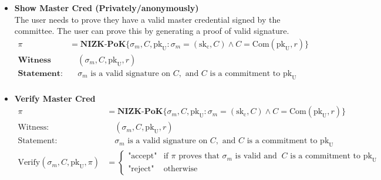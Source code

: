 \begin{itemize}
    \item \textbf{Show Master Cred (Privately/anonymously)}\\
    The user needs to prove they have a valid master credential signed by the committee. The user can prove this by generating a proof of valid signature.
    \begin{align*}
        \pi &= \textbf{NIZK-PoK}\{\sigma_{m}, C, \text{pk}_{\text{U}} : \sigma_{m} = (\text{sk}_{\text{c}}, C) \wedge C = \text{Com}(\text{pk}_{\text{U}}, r)\} \\
        \textbf{Witness} &\quad (\sigma_{m}, C, \text{pk}_{\text{U}}, r) \\
        \textbf{Statement:} &\quad \sigma_{m} \text{ is a valid signature on } C, \text{ and } C \text{ is a commitment to } \text{pk}_{\text{U}}\\
    \end{align*}
\end{itemize}


\begin{itemize}
\item \textbf{Verify Master Cred}
\begin{align*}
    \pi &= \textbf{NIZK-PoK}\{\sigma_{m}, C, \text{pk}_{\text{U}} : \sigma_{m} = (\text{sk}_{\text{c}}, C) \wedge C = \text{Com}(\text{pk}_{\text{U}}, r)\} \\
    \text{Witness:} &\quad (\sigma_{m}, C, \text{pk}_{\text{U}}, r) \\
    \text{Statement:} &\quad \sigma_{m} \text{ is a valid signature on } C, \text{ and } C \text{ is a commitment to } \text{pk}_{\text{U}} \\
    \text{Verify}(\sigma_{m}, C, \text{pk}_{\text{U}}, \pi) &= 
    \begin{cases}
        \text{"accept"} & \text{if } \pi \text{ proves that } \sigma_{m} \text{ is valid and } \ C \text{ is a commitment to } \text{pk}_{\text{U}} \\
        \text{"reject"} & \text{otherwise}
    \end{cases}
\end{align*}

\end{itemize}